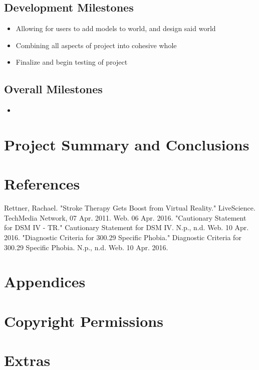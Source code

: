 \documentclass[a4paper,10pt]{article}
\begin{document}
	\subsection{Development Milestones}
		\begin{itemize}
			\item Allowing for users to add models to world, and design said world
			\item Combining all aspects of project into cohesive whole
			\item Finalize and begin testing of project
		\end{itemize}
	\subsection{Overall Milestones}
		\begin{itemize}
			\item 
		\end{itemize}

\pagebreak
\section{Project Summary and Conclusions}

\pagebreak
{}
\setcounter{page}{1}
\section{References}


\begin{thebibliography}{9}
Rettner, Rachael. "Stroke Therapy Gets Boost from Virtual Reality." LiveScience. TechMedia Network, 07 Apr. 2011. Web. 06 Apr. 2016.
"Cautionary Statement for DSM IV - TR." Cautionary Statement for DSM IV. N.p., n.d. Web. 10 Apr. 2016.
"Diagnostic Criteria for 300.29 Specific Phobia." Diagnostic Criteria for 300.29 Specific Phobia. N.p., n.d. Web. 10 Apr. 2016.
\end{thebibliography}

\section{Appendices}

\section{Copyright Permissions}

\section{Extras}
\end{document}
